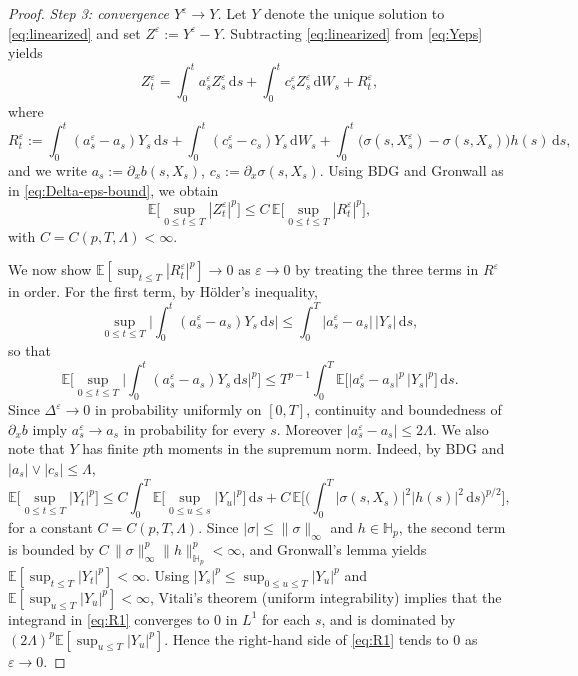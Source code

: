 \documentclass[11pt]{article}
\newcommand{\E}{\mathbb{E}}
\newcommand{\Hb}{\mathbb{H}}
\newcommand{\1}{\mathbf{1}}
\newcommand{\dd}{\mathrm{d}}
\theoremstyle{plain}
\theoremstyle{definition}
\theoremstyle{remark}
\begin{document}
\begin{proof}
\medskip
\noindent\emph{Step 3: convergence $Y^\varepsilon\to Y$.}
Let $Y$ denote the unique solution to \eqref{eq:linearized} and set $Z^\varepsilon:=Y^\varepsilon-Y$.
Subtracting \eqref{eq:linearized} from \eqref{eq:Yeps} yields
\[
Z_t^\varepsilon=\int_0^t a_s^\varepsilon Z_s^\varepsilon\,\dd s+\int_0^t c_s^\varepsilon Z_s^\varepsilon\,\dd W_s+R_t^\varepsilon,
\]
where
\[
R_t^\varepsilon:=\int_0^t (a_s^\varepsilon-a_s)Y_s\,\dd s+\int_0^t (c_s^\varepsilon-c_s)Y_s\,\dd W_s
+\int_0^t \big(\sigma(s,X_s^\varepsilon)-\sigma(s,X_s)\big)h(s)\,\dd s,
\]
and we write $a_s:=\partial_x b(s,X_s)$, $c_s:=\partial_x\sigma(s,X_s)$.
Using BDG and Gronwall as in \eqref{eq:Delta-eps-bound}, we obtain
\begin{equation}\label{eq:Zeps-gron}
\E\Big[\sup_{0\le t\le T}|Z_t^\varepsilon|^p\Big]\le C\,\E\Big[\sup_{0\le t\le T}|R_t^\varepsilon|^p\Big],
\end{equation}
with $C=C(p,T,\Lambda)<\infty$.

We now show $\E[\sup_{t\le T}|R_t^\varepsilon|^p]\to0$ as $\varepsilon\to0$ by treating the three terms in $R^\varepsilon$ in order.
For the first term, by H\"older's inequality,
\[
\sup_{0\le t\le T}\Big|\int_0^t (a_s^\varepsilon-a_s)Y_s\,\dd s\Big|
\le \int_0^T |a_s^\varepsilon-a_s|\,|Y_s|\,\dd s,
\]
so that
\begin{equation}\label{eq:R1}
\E\Big[\sup_{0\le t\le T}\Big|\int_0^t (a_s^\varepsilon-a_s)Y_s\,\dd s\Big|^p\Big]
\le T^{p-1}\int_0^T \E\big[|a_s^\varepsilon-a_s|^p\,|Y_s|^p\big]\,\dd s.
\end{equation}
Since $\Delta^\varepsilon\to0$ in probability uniformly on $[0,T]$, continuity and boundedness of $\partial_x b$ imply $a_s^\varepsilon\to a_s$ in probability for every $s$.
Moreover $|a_s^\varepsilon-a_s|\le 2\Lambda$.
We also note that $Y$ has finite $p$th moments in the supremum norm. Indeed, by BDG and $|a_s|\vee|c_s|\le \Lambda$,
\[
\E\Big[\sup_{0\le t\le T}|Y_t|^p\Big]
\le C\int_0^T \E\Big[\sup_{0\le u\le s}|Y_u|^p\Big]\,\dd s
+ C\,\E\Big[\Big(\int_0^T |\sigma(s,X_s)|^2|h(s)|^2\,\dd s\Big)^{p/2}\Big],
\]
for a constant $C=C(p,T,\Lambda)$.
Since $|\sigma|\le \|\sigma\|_\infty$ and $h\in \Hb_p$, the second term is bounded by $C\,\|\sigma\|_\infty^p\|h\|_{\Hb_p}^p<\infty$, and Gronwall's lemma yields $\E[\sup_{t\le T}|Y_t|^p]<\infty$.
Using $|Y_s|^p\le \sup_{0\le u\le T}|Y_u|^p$ and $\E[\sup_{u\le T}|Y_u|^p]<\infty$,
Vitali's theorem (uniform integrability) implies that the integrand in \eqref{eq:R1} converges to $0$ in $L^1$ for each $s$,
and is dominated by $(2\Lambda)^p\E[\sup_{u\le T}|Y_u|^p]$.
Hence the right-hand side of \eqref{eq:R1} tends to $0$ as $\varepsilon\to0$.


\end{proof}
\end{document}
